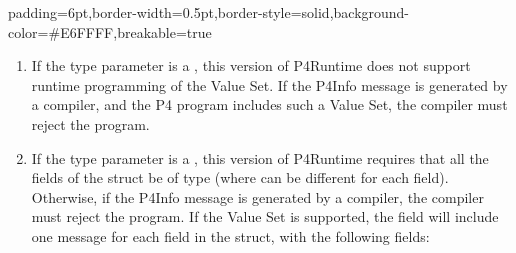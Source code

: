 \documentclass[11pt]{article}
\begin{document}
{%
\begin{mdbmargintb}{6pt}{6pt}%
\begin{mdblock}{padding=6pt,border-width=0.5pt,border-style=solid,background-color=\#E6FFFF,breakable=true}%
\begin{mdpre}%
\end{mdpre}%
\end{mdblock}%
\end{mdbmargintb}%

\begin{enumerate}[,start=2]%

\item{}
If the type parameter is a , this version of P4Runtime does not
support runtime programming of the Value Set. If the P4Info message is
generated by a compiler, and the P4 program includes such a Value Set, the
compiler must reject the program.%

\item{}
If the type parameter is a , this version of P4Runtime requires that
all the fields of the struct be of type  (where  can be different
for each field). Otherwise, if the P4Info message is generated by a compiler,
the compiler must reject the program. If the Value Set is supported, the
 field will include one  message for each field in the
struct, with the following fields:%


\end{enumerate}}
\end{document}

